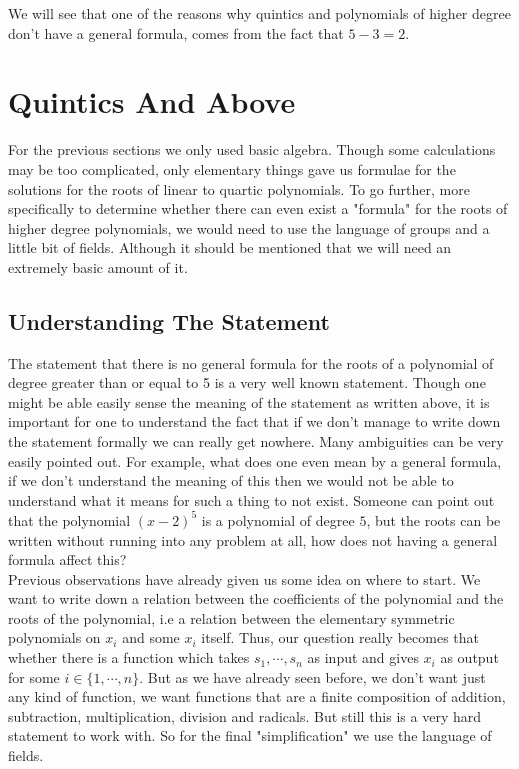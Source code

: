 We will see that one of the reasons why quintics and polynomials of higher degree don't have a general formula, comes from the fact that $5-3=2$. 

\eject

\section{Quintics And Above}

For the previous sections we only used basic algebra. Though some calculations may be too complicated, only elementary things gave us formulae for the solutions for the roots of linear to quartic polynomials. To go further, more specifically to determine whether there can even exist a "formula" for the roots of higher degree polynomials, we would need to use the language of groups and a little bit of fields. Although it should be mentioned that we will need an extremely basic amount of it. 

\subsection{Understanding The Statement}


The statement that there is no general formula for the roots of a polynomial of degree greater than or equal to 5 is a very well known statement. Though one might be able easily sense the meaning of the statement as written above, it is important for one to understand the fact that if we don't manage to write down the statement formally we can really get nowhere. Many ambiguities can be very easily pointed out. For example, what does one even mean by a general formula, if we don't understand the meaning of this then we would not be able to understand what it means for such a thing to not exist. Someone can point out that the polynomial $(x-2)^5$ is a polynomial of degree $5$, but the roots can be written without running into any problem at all, how does not having a general formula affect this?\\

Previous observations have already given us some idea on where to start. We want to write down a relation between the coefficients of the polynomial and the roots of the polynomial, i.e a relation between the elementary symmetric polynomials on $x_i$ and some $x_i$ itself. Thus, our question really becomes that whether there is a function which takes $s_1,\cdots,s_n$ as input and gives $x_i$ as output for some $i\in\{1,\cdots,n\}$. But as we have already seen before, we don't want just any kind of function, we want functions that are a finite composition of addition, subtraction,  multiplication, division and radicals. But still this is a very hard statement to work with. So for the final "simplification" we use the language of fields.\\

